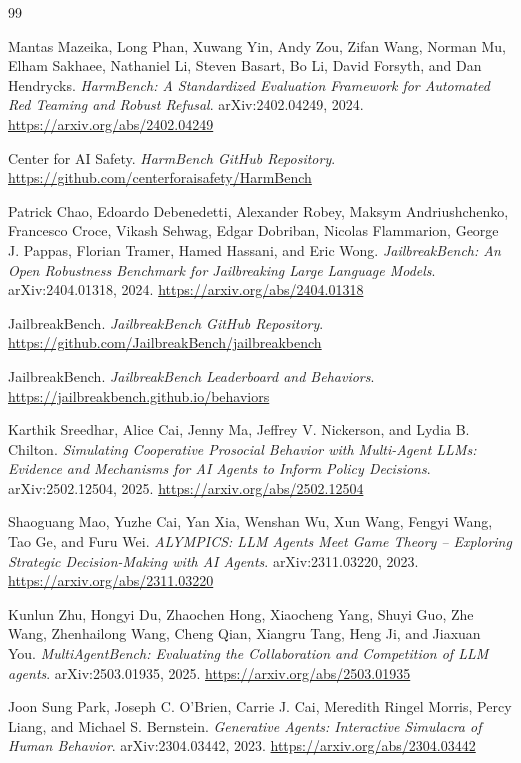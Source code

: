 \documentclass{article}
\begin{document}
\begin{thebibliography}{99}

Mantas Mazeika, Long Phan, Xuwang Yin, Andy Zou, Zifan Wang, Norman Mu, Elham Sakhaee, Nathaniel Li, Steven Basart, Bo Li, David Forsyth, and Dan Hendrycks.
\newblock \emph{HarmBench: A Standardized Evaluation Framework for Automated Red Teaming and Robust Refusal}.
\newblock arXiv:2402.04249, 2024.
\newblock \url{https://arxiv.org/abs/2402.04249}

Center for AI Safety.
\newblock \emph{HarmBench GitHub Repository}.
\newblock \url{https://github.com/centerforaisafety/HarmBench}

Patrick Chao, Edoardo Debenedetti, Alexander Robey, Maksym Andriushchenko, Francesco Croce, Vikash Sehwag, Edgar Dobriban, Nicolas Flammarion, George J. Pappas, Florian Tramer, Hamed Hassani, and Eric Wong.
\newblock \emph{JailbreakBench: An Open Robustness Benchmark for Jailbreaking Large Language Models}.
\newblock arXiv:2404.01318, 2024.
\newblock \url{https://arxiv.org/abs/2404.01318}

JailbreakBench.
\newblock \emph{JailbreakBench GitHub Repository}.
\newblock \url{https://github.com/JailbreakBench/jailbreakbench}

JailbreakBench.
\newblock \emph{JailbreakBench Leaderboard and Behaviors}.
\newblock \url{https://jailbreakbench.github.io/behaviors}

Karthik Sreedhar, Alice Cai, Jenny Ma, Jeffrey V. Nickerson, and Lydia B. Chilton.
\newblock \emph{Simulating Cooperative Prosocial Behavior with Multi-Agent LLMs: Evidence and Mechanisms for AI Agents to Inform Policy Decisions}.
\newblock arXiv:2502.12504, 2025.
\newblock \url{https://arxiv.org/abs/2502.12504}

Shaoguang Mao, Yuzhe Cai, Yan Xia, Wenshan Wu, Xun Wang, Fengyi Wang, Tao Ge, and Furu Wei.
\newblock \emph{ALYMPICS: LLM Agents Meet Game Theory -- Exploring Strategic Decision-Making with AI Agents}.
\newblock arXiv:2311.03220, 2023.
\newblock \url{https://arxiv.org/abs/2311.03220}

Kunlun Zhu, Hongyi Du, Zhaochen Hong, Xiaocheng Yang, Shuyi Guo, Zhe Wang, Zhenhailong Wang, Cheng Qian, Xiangru Tang, Heng Ji, and Jiaxuan You.
\newblock \emph{MultiAgentBench: Evaluating the Collaboration and Competition of LLM agents}.
\newblock arXiv:2503.01935, 2025.
\newblock \url{https://arxiv.org/abs/2503.01935}

Joon Sung Park, Joseph C. O'Brien, Carrie J. Cai, Meredith Ringel Morris, Percy Liang, and Michael S. Bernstein.
\newblock \emph{Generative Agents: Interactive Simulacra of Human Behavior}.
\newblock arXiv:2304.03442, 2023.
\newblock \url{https://arxiv.org/abs/2304.03442}

\end{thebibliography}
\end{document}
